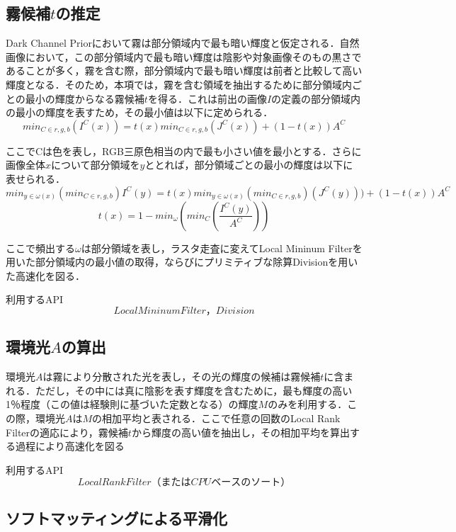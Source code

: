 \documentclass{jsarticle}
\begin{document}
\subsection{霧候補$t$の推定}
\label{霧候補$t$の推定}

Dark Channel Priorにおいて霧は部分領域内で最も暗い輝度と仮定される．自然画像において，この部分領域内で最も暗い輝度は陰影や対象画像そのもの黒さであることが多く，霧を含む際，部分領域内で最も暗い輝度は前者と比較して高い輝度となる．そのため，本項では，霧を含む領域を抽出するために部分領域内ごとの最小の輝度からなる霧候補$t$を得る．これは前出の画像$I$の定義の部分領域内の最小の輝度を表すため，その最小値は以下に定められる．
\[
min_{C\in{r,g,b}}(I^C(x)) = t(x) min_{C\in{r,g,b}}(J^C(x)) + (1-t(x))A^C
\]

ここでCは色を表し，RGB三原色相当の内で最も小さい値を最小とする．さらに画像全体$x$について部分領域を$y$ととれば，部分領域ごとの最小の輝度は以下に表せられる．
\[
min_{y \in \omega(x)} (min_{C \in{r,g,b}}) I^C(y) = t(x) min_{y \in \omega(x)}(min_{C \in{r,g,b}})(J^C(y))) + (1-t(x))A^C
\]
\[
t(x)=1-min_{\omega} (min_{C}(\frac{I^C(y)}{A^C}))
\]

ここで頻出する$\omega$は部分領域を表し，ラスタ走査に変えてLocal Mininum Filterを用いた部分領域内の最小値の取得，ならびにプリミティブな除算Divisionを用いた高速化を図る．

\begin{itembox}[l]{利用するAPI}
\[
Local Mininum Filter，Division
\]
\end{itembox}

\subsection{環境光$A$の算出}
\label{環境光$A$の算出}

環境光$A$は霧により分散された光を表し，その光の輝度の候補は霧候補$t$に含まれる．ただし，その中には真に陰影を表す輝度を含むために，最も輝度の高い1％程度（この値は経験則に基づいた定数となる）の輝度$M$のみを利用する．この際，環境光$A$は$M$の相加平均と表される．ここで任意の回数のLocal Rank Filterの適応により，霧候補$t$から輝度の高い値を抽出し，その相加平均を算出する過程により高速化を図る

\begin{itembox}[l]{利用するAPI}
\[
Local Rank Filter（またはCPUベースのソート）
\]
\end{itembox}

\subsection{ソフトマッティングによる平滑化}
\label{ソフトマッティングによる平滑化}
\end{document}
